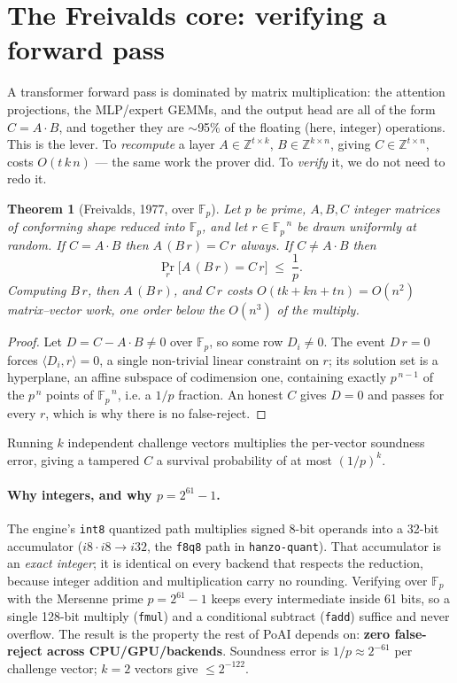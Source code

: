 \documentclass[11pt]{article}
\newtheorem{theorem}{Theorem}
\newcommand{\Fp}{\ensuremath{\mathbb{F}_p}}
\newcommand{\code}[1]{\texttt{#1}}
\newcommand{\inner}[2]{\ensuremath{\langle #1, #2\rangle}}
\begin{document}
\section{The Freivalds core: verifying a forward pass}
\label{sec:freivalds}

A transformer forward pass is dominated by matrix multiplication: the
attention projections, the MLP/expert GEMMs, and the output head are all of the
form $C = A\cdot B$, and together they are $\sim$95\% of the floating (here,
integer) operations. This is the lever. To \emph{recompute} a layer
$A\in\mathbb{Z}^{t\times k}$, $B\in\mathbb{Z}^{k\times n}$, giving
$C\in\mathbb{Z}^{t\times n}$, costs $O(t\,k\,n)$ --- the same work the prover
did. To \emph{verify} it, we do not need to redo it.

\begin{theorem}[Freivalds, 1977, over $\Fp$]
\label{thm:freivalds}
Let $p$ be prime, $A,B,C$ integer matrices of conforming shape reduced into
$\Fp$, and let $r \in \Fp^{\,n}$ be drawn uniformly at random. If
$C = A\cdot B$ then $A\,(B\,r) = C\,r$ \emph{always}. If $C \neq A\cdot B$ then
\[
  \Pr_{r}\!\big[A\,(B\,r) = C\,r\big] \;\le\; \frac{1}{p}.
\]
Computing $B\,r$, then $A\,(B\,r)$, and $C\,r$ costs $O(t k + k n + t n) = O(n^2)$
matrix--vector work, one order below the $O(n^3)$ of the multiply.
\end{theorem}

\begin{proof}
Let $D = C - A\cdot B \neq 0$ over $\Fp$, so some row $D_i \neq 0$. The event
$D\,r = 0$ forces $\inner{D_i}{r} = 0$, a single non-trivial linear
constraint on $r$; its solution set is a hyperplane, an affine subspace of
codimension one, containing exactly $p^{\,n-1}$ of the $p^{\,n}$ points of
$\Fp^{\,n}$, i.e. a $1/p$ fraction. An honest $C$ gives $D = 0$ and passes for
every $r$, which is why there is no false-reject.
\end{proof}

Running $k$ independent challenge vectors multiplies the per-vector soundness
error, giving a tampered $C$ a survival probability of at most $(1/p)^k$.

\paragraph{Why integers, and why $p = 2^{61}-1$.}
The engine's \code{int8} quantized path multiplies signed 8-bit operands into a
32-bit accumulator ($i8\cdot i8 \to i32$, the \code{f8q8} path in
\code{hanzo-quant}). That accumulator is an \emph{exact integer}; it is identical
on every backend that respects the reduction, because integer addition and
multiplication carry no rounding. Verifying over $\Fp$ with the Mersenne prime
$p = 2^{61}-1$ keeps every intermediate inside 61 bits, so a single 128-bit
multiply (\code{fmul}) and a conditional subtract (\code{fadd}) suffice and never
overflow. The result is the property the rest of PoAI depends on:
\textbf{zero false-reject across CPU/GPU/backends}. Soundness error is
$1/p \approx 2^{-61}$ per challenge vector; $k = 2$ vectors give $\le 2^{-122}$.
\end{document}
